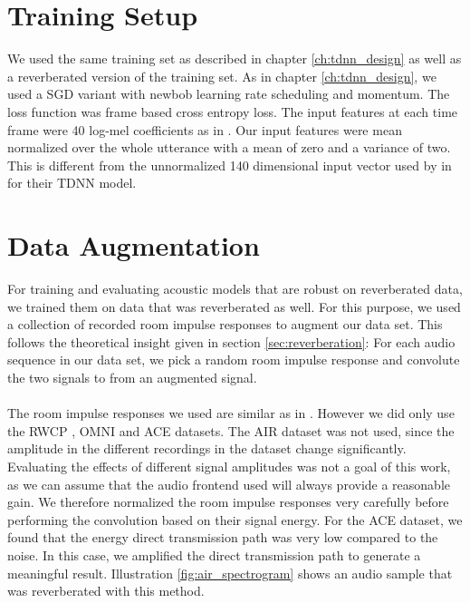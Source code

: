 \section{Training Setup}
We used the same training set as described in chapter \ref{ch:tdnn_design} as well as a reverberated version of the training set. As in chapter \ref{ch:tdnn_design}, we used a SGD variant with newbob learning rate scheduling and momentum. The loss function was frame based cross entropy loss. The input features at each time frame were 40 log-mel coefficients as in \cite{nguyen20162016}. Our input features were mean normalized over the whole utterance with a mean of zero and a variance of two. This is different from the unnormalized 140 dimensional input vector used by \cite{peddinti2015reverberation} in \cite{peddinti2015jhu} for their TDNN model.
\section{Data Augmentation}
For training and evaluating acoustic models that are robust on reverberated data, we trained them on data that was reverberated as well. For this purpose, we used a collection of recorded room impulse responses to augment our data set. This follows the theoretical insight given in section \ref{sec:reverberation}: For each audio sequence in our data set, we pick a random room impulse response and convolute the two signals to from an augmented signal. \\ \\
The room impulse responses we used are similar as in \cite{ritter2016training}. However we did only use the RWCP \cite{nakamura2000acoustical}, OMNI \cite{stewart2010database} and ACE \cite{eaton2015ace} datasets. The AIR dataset  \cite{jeub2009binaural} was not used, since the amplitude in the different recordings in the dataset change significantly.
Evaluating the effects of different signal amplitudes was not a goal of this work, as we can assume that the audio frontend used will always provide a reasonable gain. We therefore normalized the room impulse responses very carefully before performing the convolution based on their signal energy. For the ACE dataset, we found that the energy direct transmission path was very low compared to the noise. In this case, we amplified the direct transmission path to generate a meaningful result.
Illustration \ref{fig:air_spectrogram} shows an audio sample that was reverberated with this method. 
